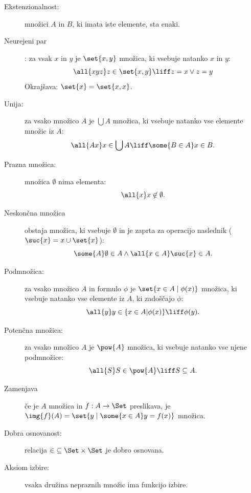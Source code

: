 \begin{description}

\item[Ekstenzionalnost:] množici $A$ in $B$, ki imata iste elemente, sta enaki.

\item[Neurejeni par]: za vsak $x$ in $y$ je $\set{x, y}$ množica, ki vsebuje natanko $x$ in $y$:
  \begin{equation*}
    \all{x y z} z \in \set{x, y} \liff z = x \lor z = y
  \end{equation*}
  Okrajšava: $\set{x} = \set{x, x}$.

\item[Unija:] za vsako množico $A$ je $\bigcup A$ množica, ki vsebuje natanko vse
  elemente množic iz $A$:
  \begin{equation*}
    \all{A x} x \in \bigcup A \liff \some{B \in A} x \in B.
  \end{equation*}

\item[Prazna množica:] množica $\emptyset$ nima elementa:
  \begin{equation*}
  \all{x} x \not\in \emptyset.
  \end{equation*}

\item[Neskončna množica] obstaja množica, ki vsebuje $\emptyset$ in je zaprta za operacijo naslednik
  ($\suc{x} = x \cup \set{x}$):
  \begin{equation*}
    \some{A} \emptyset \in A \land \all{x \in A} \suc{x} \in A.
  \end{equation*}

\item[Podmnožica:] za vsako množico $A$ in formulo $\phi$ je $\set{x \in A \mid \phi(x)}$
  množica, ki vsebuje natanko vse elemente iz $A$, ki zadoščajo $\phi$:
  \begin{equation*}
    \all{y} y \in \{x \in A | \phi(x)\} \liff \phi(y).
  \end{equation*}

\item[Potenčna množica:] za vsako množico $A$ je $\pow{A}$ množica, ki vsebuje
  natanko vse njene podmnožice:
  \begin{equation*}
    \all{S} S \in \pow{A} \liff S \subseteq A.
  \end{equation*}

\item[Zamenjava] če je $A$ množica in $f : A \to \Set$ preslikava, je
  $
    \img{f}(A) = \set{ y \mid \some{x \in A} y = f(x) }
  $
  množica.

\item[Dobra osnovanost:] relacija ${\in} \subseteq \Set \times \Set$ je dobro osnovana.

\item[Aksiom izbire:] vsaka družina nepraznih množic ima funkcijo izbire.
\end{description}


